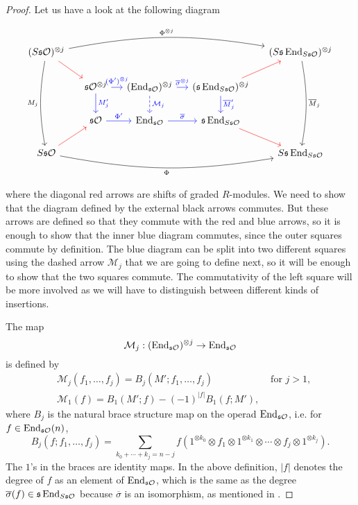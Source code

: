 \documentclass[Thesis.tex]{subfiles}
\begin{document}
\begin{proof}
Let us have a look at the following diagram

\begin{equation}\label{proofdiagram}
\begin{tikzcd}[column sep = 1.2em]
(S\s\OO)^{\otimes j}\arrow[dr,red] \arrow[ddd, bend right=10,"M_j"']\arrow[rrrr,bend left=10, "\Phi^{\otimes j}"]& & & & (S\s\End_{S\s\OO})^{\otimes j}\arrow[ddd, bend left=10, "\overline{M}_j"]\\
&\s\OO^{\otimes j}\arrow[r,blue, "(\Phi')^{\otimes j}"]\arrow[d, blue, "M'_j"] & (\End_{\s\OO})^{\otimes j}\arrow[r, blue,"\overline{\sigma}^{\otimes j}"] \arrow[d, dashed, "\mathcal{M}_j",blue]& (\s\End_{S\s\OO})^{\otimes j}\arrow[ur,red]\arrow[d, "\overline{M}'_j",blue]& \\
&\s\OO\arrow[r, blue, "\Phi'"]& \End_{\s\OO} \arrow[r, blue, "\overline{\sigma}"] & \s\End_{S\s\OO}\arrow[dr,red]& \\
S\s\OO\arrow[rrrr, bend right=10, "\Phi"']\arrow[ur,red]& & & & S\s\End_{S\s\OO}
\end{tikzcd}
\end{equation}

where the diagonal red arrows are shifts of graded $R$-modules. We need to show that the diagram defined by the external black arrows commutes. But these arrows are defined so that they commute with the red and blue arrows, so it is enough to show that the inner blue diagram commutes, since the outer squares commute by definition. The blue diagram can be split into two different squares using the dashed arrow $\mathcal{M}_j$ that we are going to define next, so it will be enough to show that the two squares commute. The commutativity of the  left square will be more involved as we will have to distinguish between different kinds of insertions.

 The map 
\[\mathcal{M}_j:(\operatorname{End}_{\mathfrak{s}{\mathcal O}})^{\otimes j}\to\operatorname{End}_{\mathfrak{s}{\mathcal O}}\]
is defined by 
\begin{align*}
&\mathcal{M}_j(f_1, \dots, f_j)=B_j(M';f_1,\dots, f_j) &\text{ for }j>1,\\
&\mathcal{M}_1(f)=B_1(M';f)-(-1)^{|f|}B_1(f;M'),
\end{align*}
 where $B_j$ is the natural brace structure map on the operad $\operatorname{End}_{\mathfrak{s}{\mathcal O}}$, i.e. for $f\in\operatorname{End}_{\mathfrak{s}{\mathcal O}}(n)$, 
\[B_j(f;f_1,\dots, f_j)=\sum_{k_0+\cdots+k_j=n-j}f(1^{\otimes k_0}\otimes f_1\otimes 1^{\otimes k_1}\otimes\cdots\otimes f_j\otimes 1^{\otimes k_j}).\]
 The $1$'s in the braces are identity maps. In the above definition, $|f|$ denotes the degree of $f$ as an element of $\operatorname{End}_{\mathfrak{s}{\mathcal O}}$, which is the same as the degree $\overline{\sigma}(f)\in \mathfrak{s}\operatorname{End}_{S\mathfrak{s}{\mathcal O}}$ because $\overline{\sigma}$ is an isomorphism, as mentioned in .  %
 

\end{proof}
\end{document}
